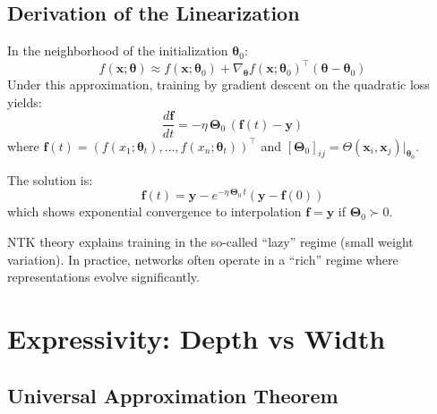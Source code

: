 \subsection{Derivation of the Linearization}

\begin{mathbox}[title=\textbf{Taylor Linearization of the Network}]
In the neighborhood of the initialization $\boldsymbol{\theta}_0$:
\begin{equation}
f(\mathbf{x}; \boldsymbol{\theta}) \approx f(\mathbf{x}; \boldsymbol{\theta}_0) + \nabla_{\boldsymbol{\theta}} f(\mathbf{x}; \boldsymbol{\theta}_0)^\top (\boldsymbol{\theta} - \boldsymbol{\theta}_0)
\end{equation}
Under this approximation, training by gradient descent on the
quadratic loss yields:
\begin{equation}
\frac{d\mathbf{f}}{dt} = -\eta\,\boldsymbol{\Theta}_0\,(\mathbf{f}(t) - \mathbf{y})
\end{equation}
where $\mathbf{f}(t) = (f(x_1; \boldsymbol{\theta}_t), \ldots, f(x_n; \boldsymbol{\theta}_t))^\top$
and $[\boldsymbol{\Theta}_0]_{ij} = \Theta(\mathbf{x}_i, \mathbf{x}_j)\big|_{\boldsymbol{\theta}_0}$.

The solution is:
\begin{equation}
\mathbf{f}(t) = \mathbf{y} - e^{-\eta\,\boldsymbol{\Theta}_0\,t}(\mathbf{y} - \mathbf{f}(0))
\end{equation}
which shows exponential convergence to interpolation $\mathbf{f} = \mathbf{y}$
if $\boldsymbol{\Theta}_0 \succ 0$.
\end{mathbox}

\begin{remark}
NTK theory explains training in the so-called ``lazy'' regime
(small weight variation). In practice, networks often operate
in a ``rich'' regime where representations evolve
significantly.
\end{remark}

\section{Expressivity: Depth vs Width}
\label{sec:expressivity}

\subsection{Universal Approximation Theorem}

